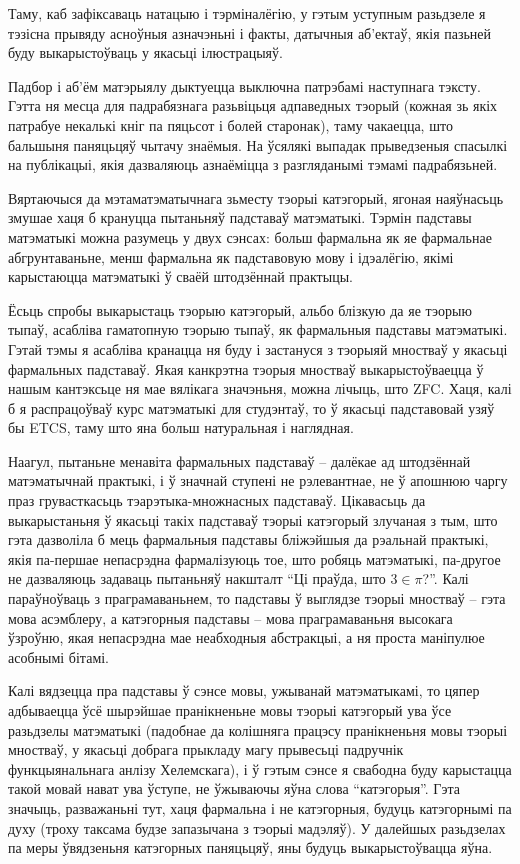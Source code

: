 \documentclass[a4paper,12pt]{book}
\begin{document}
Таму, каб зафіксаваць натацыю і тэрміналёгію, у гэтым уступным разьдзеле
я тэзісна прывяду асноўныя азначэньні і факты, датычныя аб'ектаў, якія
пазьней буду выкарыстоўваць у якасьці ілюстрацыяў.

Падбор і аб'ём матэрыялу дыктуецца выключна патрэбамі наступнага
тэксту. Гэтта ня месца для падрабязнага разьвіцьця адпаведных тэорый
(кожная зь якіх патрабуе некалькі кніг па пяцьсот і болей старонак), таму
чакаецца, што бальшыня паняцьцяў чытачу знаёмыя. На ўсялякі выпадак
прыведзеныя спасылкі на публікацыі, якія дазваляюць азнаёміцца з
разгляданымі тэмамі падрабязьней.

Вяртаючыся да мэтаматэматычнага зьместу тэорыі катэгорый, ягоная
наяўнасьць змушае хаця б крануцца пытаньняў падставаў
матэматыкі. Тэрмін падставы матэматыкі можна разумець у двух сэнсах:
больш фармальна як яе фармальнае абгрунтаваньне, менш фармальна як
падставовую мову і ідэалёгію, якімі карыстаюцца матэматыкі ў сваёй
штодзённай практыцы.

Ёсьць спробы выкарыстаць тэорыю катэгорый, альбо блізкую да яе тэорыю
тыпаў, асабліва гаматопную тэорыю тыпаў, як фармальныя падставы
матэматыкі. Гэтай тэмы я асабліва кранацца ня буду і застануся з тэорыяй
мностваў у якасьці фармальных падставаў. Якая канкрэтна тэорыя
мностваў выкарыстоўваецца ў нашым кантэксьце ня мае вялікага
значэньня, можна лічыць, што ZFC. Хаця, калі б я распрацоўваў курс
матэматыкі для студэнтаў, то ў якасьці падставовай узяў бы ETCS, таму
што яна больш натуральная і наглядная.

Наагул, пытаньне менавіта фармальных падставаў -- далёкае ад
штодзённай матэматычнай практыкі, і ў значнай ступені не
рэлевантнае, не ў апошнюю чаргу праз грувасткасьць
тэарэтыка-множнасных падставаў. Цікавасьць да выкарыстаньня ў якасьці
такіх падставаў
тэорыі катэгорый злучаная з тым, што гэта дазволіла б мець фармальныя
падставы бліжэйшыя да рэальнай практыкі, якія па-першае непасрэдна
фармалізуюць тое, што робяць матэматыкі, па-другое не дазваляюць
задаваць пытаньняў накшталт ``Ці праўда, што $3 \in \pi$?''. Калі
параўноўваць з праграмаваньнем, то падставы ў выглядзе тэорыі мностваў
-- гэта мова асэмблеру, а катэгорныя падставы -- мова праграмаваньня
высокага ўзроўню, якая непасрэдна мае неабходныя абстракцыі, а ня
проста маніпулюе асобнымі бітамі.

Калі вядзецца пра падставы ў сэнсе мовы, ужыванай матэматыкамі, то цяпер
адбываецца ўсё шырэйшае пранікненьне мовы тэорыі катэгорый ува ўсе
разьдзелы матэматыкі (падобнае да колішняга працэсу пранікненьня мовы
тэорыі мностваў, у якасьці добрага прыкладу магу прывесьці падручнік
функцыянальнага анлізу Хелемскага), і ў гэтым сэнсе я свабодна буду
карыстацца такой
мовай нават ува ўступе, не ўжываючы яўна слова ``катэгорыя''. Гэта
значыць, разважаньні тут, хаця фармальна і не катэгорныя, будуць
катэгорнымі па духу (троху таксама будзе запазычана з тэорыі
мадэляў). У далейшых разьдзелах па меры ўвядзеньня
катэгорных паняцьцяў, яны будуць выкарыстоўвацца яўна.
\end{document}
